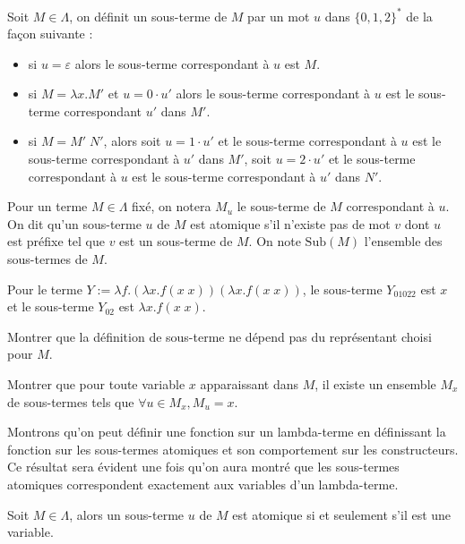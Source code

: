 \begin{defi}
    Soit $M\in\Lambda$, on définit un sous-terme de $M$ par un mot $u$ dans $\{0,1,2\}^*$ de la façon suivante :
    \begin{itemize}[label=$\bullet$]
        \item si $u=\varepsilon$ alors le sous-terme correspondant à $u$ est $M$.
        \item si $M = \lambda x.M'$ et $u = 0\cdot u'$ alors le sous-terme correspondant à $u$ est le sous-terme correspondant $u'$ dans $M'$.
        \item si $M = M'\;N'$, alors soit $u = 1\cdot u'$ et le sous-terme correspondant à $u$ est le sous-terme correspondant à $u'$ dans $M'$, soit $u = 2\cdot u'$ et le sous-terme correspondant à $u$ est le sous-terme correspondant à $u'$ dans $N'$.
    \end{itemize}

    Pour un terme $M\in\Lambda$ fixé, on notera $M_u$ le sous-terme de $M$ correspondant à $u$. On dit qu'un sous-terme $u$ de $M$ est atomique s'il n'existe pas de mot $v$ dont $u$ est préfixe tel que $v$ est un sous-terme de $M$. On note $\mathrm{Sub}(M)$ l'ensemble des sous-termes de $M$.
\end{defi}

\begin{expl}
    Pour le terme $Y := \lambda f.(\lambda x.f(x\;x))(\lambda x.f(x\;x))$, le sous-terme $Y_{01022}$ est $x$ et le sous-terme $Y_{02}$ est $\lambda x.f(x\;x)$.
\end{expl}

\begin{exo}
    Montrer que la définition de sous-terme ne dépend pas du représentant choisi pour $M$.
\end{exo}

\begin{exo}
    Montrer que pour toute variable $x$ apparaissant dans $M$, il existe un ensemble $M_x$ de sous-termes tels que $\forall u\in M_x, M_u = x$.
\end{exo}

Montrons qu'on peut définir une fonction sur un lambda-terme en définissant la fonction sur les sous-termes atomiques et son comportement sur les constructeurs. Ce résultat sera évident une fois qu'on aura montré que les sous-termes atomiques correspondent exactement aux variables d'un lambda-terme.

\begin{prop}
    Soit $M\in\Lambda$, alors un sous-terme $u$ de $M$ est atomique si et seulement s'il est une variable.
\end{prop}


